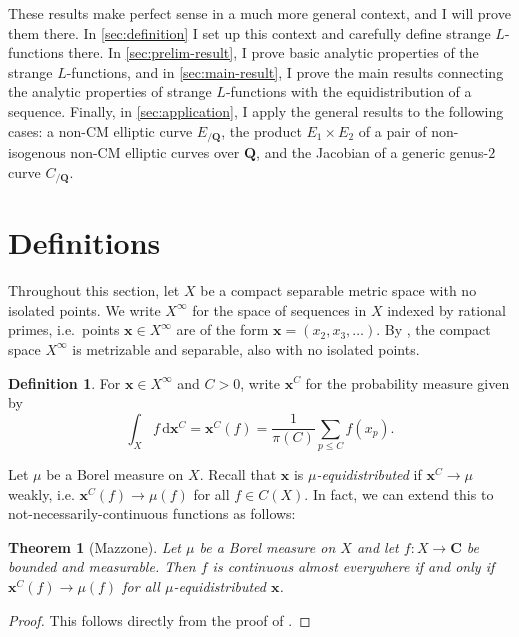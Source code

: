\documentclass{article}
\newcommand{\bC}{\mathbf{C}}
\newcommand{\bQ}{\mathbf{Q}}
\newcommand{\bx}{\boldsymbol{x}}
\newcommand{\dd}{\mathrm{d}}
\newtheorem{theorem}[subsection]{Theorem}
\theoremstyle{definition}
\newtheorem{definition}[subsection]{Definition}
\begin{document}
These results make perfect sense in a much more general context, and I will 
prove them there. In \autoref{sec:definition} I set up this context and 
carefully define strange $L$-functions there. In \autoref{sec:prelim-result}, I 
prove basic analytic properties of the strange $L$-functions, and in 
\autoref{sec:main-result}, I prove the main results connecting the analytic 
properties of strange $L$-functions with the equidistribution of a sequence. 
Finally, in \autoref{sec:application}, I apply the general results to the 
following cases: a non-CM elliptic curve $E_{/\bQ}$, the product 
$E_1\times E_2$ of a pair of non-isogenous non-CM elliptic curves over $\bQ$, 
and the Jacobian of a generic genus-$2$ curve $C_{/\bQ}$. 





\section{Definitions}\label{sec:definition}

Throughout this section, let $X$ be a compact separable metric space with no 
isolated points. We write $X^\infty$ for the space of sequences in $X$ indexed 
by rational primes, i.e.~points $\bx\in X^\infty$ are of the form 
$\bx=(x_2,x_3,\dots)$. By \cite[Cor.~2.3.16 \& Th.~4.2.2]{engelking-1989}, the 
compact space $X^\infty$ is metrizable and separable, also with no isolated 
points. 

\begin{definition}
For $\bx\in X^\infty$ and $C>0$, write $\bx^C$ for the probability measure 
given by 
\[
	\int_X f\, \dd \bx^C = \bx^C(f) = \frac{1}{\pi(C)} \sum_{p\leqslant C} f(x_p) .
\]
\end{definition}

Let $\mu$ be a Borel measure on $X$. Recall that $\bx$ is 
\emph{$\mu$-equidistributed} if $\bx^C\to \mu$ weakly, i.e. 
$\bx^C(f) \to \mu(f)$ for all $f\in C(X)$. In fact, we can extend this to 
not-necessarily-continuous functions as follows:

\begin{theorem}[Mazzone]
Let $\mu$ be a Borel measure on $X$ and let $f\colon X\to \bC$ be bounded and 
measurable. Then $f$ is continuous almost everywhere if and only if 
$\bx^C(f) \to \mu(f)$ for all $\mu$-equidistributed $\bx$. 
\end{theorem}
\begin{proof}
This follows directly from the proof of \cite[Th.~1]{mazzone-1995}.
\end{proof}
\end{document}
